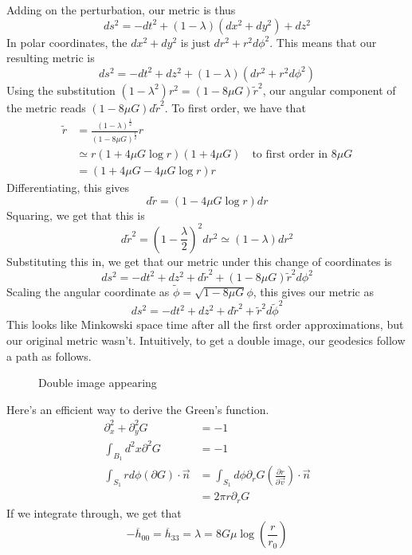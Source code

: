 Adding on the perturbation, our metric is thus 
\[
	ds ^ 2  = - dt ^ 2 + \left( 1 - \lambda  \right) \left( dx ^ 2 + dy ^ 2  \right)  + dz ^ 2 
\] In polar coordinates, the $ dx ^ 2 + dy ^ 2 $ is just $ dr ^ 2  + r ^ 2 d \phi ^ 2 $. 
This means that our resulting metric is 
\[
	ds ^ 2 =  - dt ^ 2 + dz ^  2 + \left( 1 - \lambda   \right)  \left( dr ^ 2 + r ^ 2 d \phi ^ 2  \right) 
\] Using the substitution $ \left( 1 - \lambda ^ 2   \right) r ^ 2  = \left( 1 - 8 \mu G  \right)  \tilde{r } ^ 2   $, our angular component of the 
metric reads $ \left( 1 - 8 \mu G  \right)  d \tilde{ r } ^ 2    $. 
To first order, we have that 
\begin{align*}
	\tilde{ r } &  = \frac{\left( 1 - \lambda  \right)  ^{ \frac{1}{2 } } }{ \left( 1 - 8 \mu G  \right)  ^{ \frac{1}{2 } }  } r  \\
		    &\simeq   r \left( 1 + 4 \mu G \log r   \right) \left(  1 + 4 \mu G   \right)    \quad \text{to first order in } 8 \mu G  \\ 
		    &=  \left( 1 + 4 \mu G  - 4 \mu G \log r  \right)  r  
\end{align*}  
Differentiating, this 
gives 
\[
	d \tilde{ r }  = \left( 1 - 4 \mu G \log r   \right)   dr 
\]  Squaring, we get that this is 
\[
	d \tilde{ r } ^ 2  = \left( 1 - \frac{\lambda}{2 }  \right)  ^ 2 dr ^ 2 
	\simeq \left(  1 - \lambda  \right)  dr ^ 2  
\] Substituting this in, we get that our metric under this change of coordinates 
is 
\[
	ds ^ 2  = - dt ^  2 + dz ^ 2 + d \tilde{ r } ^ 2 + \left( 1 - 8 \mu G  \right) \tilde{ r } ^ 2 d \phi ^ 2    
\] Scaling the angular coordinate as $ \tilde{ \phi }  = \sqrt{ 1 - 8 \mu G   }  \phi  $, 
this gives our metric as 
\[
 ds ^ 2 =  - dt ^2 + dz ^ 2 + d \tilde{ r } ^ 2 + \tilde{ r } ^2 d \tilde{ \phi } ^ 2    
\] This looks like Minkowski space time after all the first order approximations, 
but our original metric wasn't.
Intuitively, to get 
a double image, our geodesics follow a path as follows.
\hspace*{10cm}
\begin{figure}[htpb]
	\centering

\caption{Double image appearing}%
\label{fig:x2q2}
\end{figure}

Here's an efficient way to derive the Green's function. 
\begin{align*}
	\partial  ^ 2 _ x + \partial  ^ 2 _ y G &=  -  1  \\
	\int_{ B _ 1 } d ^ 2 x \partial  ^ 2 G  &=  - 1 \\
	\int _{ S_1 } r d \phi \left( \partial  G  \right)  \cdot  \vec{n} 
						&=  \int _{ S_ 1  } d \phi \partial  _ r G \left( \frac{\partial r }{\partial  \vec{v} }    \right) \cdot  \vec{n}  \\
						&=  2 \pi r \partial _ r G  
\end{align*}
If we integrate through, 
we get that 
\[
  - \overline{ h } _{ 00 }  = \overline{ h } _{ 33 }  = \lambda 
   = 8 G \mu \log \left( \frac{r}{r_0 }  \right) 
\] 

